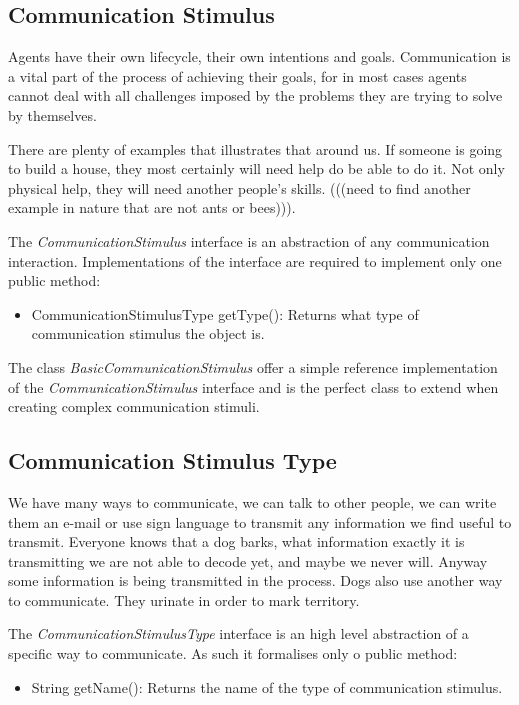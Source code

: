 \subsection{Communication Stimulus}

Agents have their own lifecycle, their own intentions and goals. Communication is a vital part of the process of achieving their goals, for in most cases agents cannot deal with all challenges imposed by the problems they are trying to solve by themselves.

There are plenty of examples that illustrates that around us. If someone is going to build a house, they most certainly will need help do be able to do it. Not only physical help, they will need another people's skills. (((need to find another example in nature that are not ants or bees))).

The \emph{CommunicationStimulus} interface is an abstraction of any communication interaction. Implementations of the interface are required to implement only one public method:

\begin{itemize}
  \item CommunicationStimulusType getType(): Returns what type of communication stimulus the object is.
\end{itemize}

The class \emph{BasicCommunicationStimulus} offer a simple reference implementation of the \emph{CommunicationStimulus} interface and is the perfect class to extend when creating complex communication stimuli.

\subsection{Communication Stimulus Type}

We have many ways to communicate, we can talk to other people, we can write them an e-mail or use sign language to transmit any information we find useful to transmit. Everyone knows that a dog barks, what information exactly it is transmitting we are not able to decode yet, and maybe we never will. Anyway some information is being transmitted in the process. Dogs also use another way to communicate. They urinate in order to mark territory.

The \emph{CommunicationStimulusType} interface is an high level abstraction of a specific way to communicate. As such it formalises only o public method:

\begin{itemize}
  \item String getName(): Returns the name of the type of communication stimulus.
\end{itemize}

